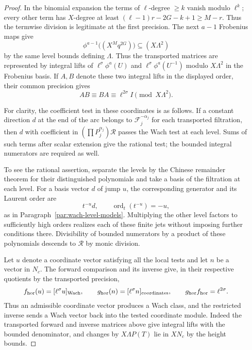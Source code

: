 \begin{proof}
In
the binomial expansion the terms of \(\ell\)-degree \(\ge k\)
vanish modulo \(\ell^k\); every other term has \(X\)-degree
at least \((\ell-1)r-2G-k+1\ge M-r\). Thus the termwise
division is legitimate at the first precision. The next
\(a-1\) Frobenius maps give
\[
             \phi^{a-1}\bigl((X^Mq^{2G})\bigr)
                                     \subseteq (X\Lambda^2)
\]
by the same level bounds defining \(\Lambda\). Thus the transported matrices are represented by
integral lifts of \(\ell^\sigma\phi^a(U)\) and
\(\ell^\sigma\phi^a(U^{-1})\) modulo \(X\Lambda^2\)
in the Frobenius basis. If \(A,B\) denote these two integral lifts in the displayed order, their common precision gives
\[
 AB\equiv BA\equiv\ell^{2\sigma}I\pmod{X\Lambda^2}.
\]


For clarity, the coefficient test in these coordinates is as
follows. If a constant direction \(d\) at the end of the arc
belongs to \(\mathcal F_j^{-\alpha_j}\) for each transported
filtration, then \(d\) with coefficient in
\((\prod P_j^{\alpha_j})\mathcal R\) passes the Wach test at
each level. Sums of such terms after scalar extension give the
rational test; the bounded integral numerators are required as
well.

To see the rational assertion, separate the levels by the
Chinese remainder theorem for their distinguished polynomials
and take a basis of the filtration at each level. For a basis vector \(d\) of jump \(u\), the corresponding generator and its Laurent order are
\[
 t^{-u}d,\qquad \operatorname{ord}_t(t^{-u})=-u,
\]
as in
Paragraph~\ref{par:wach-level-models}. Multiplying the other
level factors to sufficiently high orders realizes each of these
finite jets without imposing further conditions there.
Divisibility of bounded numerators by a product of these
polynomials descends to \(\mathcal R\) by monic division.

Let \(u\) denote a coordinate vector satisfying all the
local tests and let \(n\) be a vector in \(N_c\).
The forward comparison and its inverse give, in their
respective quotients by the transported precision,
\[
   f_{\rm hor}(u)=[\ell^\sigma u]_{\rm Wach},
   \qquad g_{\rm hor}(n)=[\ell^\sigma n]_{\rm coordinates},
   \qquad g_{\rm hor}f_{\rm hor}=\ell^{2\sigma}.
\]
Thus an admissible coordinate vector produces a Wach class,
and the restricted inverse sends a Wach vector back into the
tested coordinate module. Indeed the transported forward
and inverse matrices above give integral lifts with the bounded
denominator, and changes by \(X\Lambda P(T)\) lie in \(XN_c\)
by the height bounds.


\end{proof}
